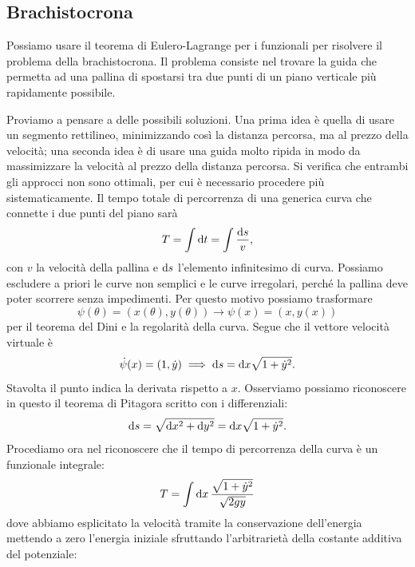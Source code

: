     \subsection{Brachistocrona}
    Possiamo usare il teorema di Eulero-Lagrange per i funzionali per risolvere il problema della brachistocrona. Il problema consiste nel trovare la guida che permetta ad una pallina di spostarsi tra due punti di un piano verticale più rapidamente possibile. 

    Proviamo a pensare a delle possibili soluzioni. Una prima idea è quella di usare un segmento rettilineo, minimizzando così la distanza percorsa, ma al prezzo della velocità; una seconda idea è di usare una guida molto ripida in modo da massimizzare la velocità al prezzo della distanza percorsa. Si verifica che entrambi gli approcci non sono ottimali, per cui è necessario procedere più sistematicamente. Il tempo totale di percorrenza di una generica curva che connette i due punti del piano sarà
    \begin{equation}
        T = \int \mathrm{d} t = \int \frac{\mathrm{d} s}{v},
    \end{equation}
    con $v$ la velocità della pallina e $\mathrm{d} s$ l'elemento infinitesimo di curva. Possiamo escludere a priori le curve non semplici e le curve irregolari, perché la pallina deve poter scorrere senza impedimenti. Per questo motivo possiamo trasformare
    \begin{equation}
        \psi(\theta) = (x(\theta),y(\theta))\to \psi(x) = (x,y(x))
    \end{equation}
    per il teorema del Dini e la regolarità della curva. Segue che il vettore velocità virtuale è 
    \begin{equation}
        \dot{\psi}(x) = (1,\dot{y})\implies \mathrm{d} s = \mathrm{d} x\sqrt{1+\dot{y}^2}.
    \end{equation}
    Stavolta il punto indica la derivata rispetto a $x$. Osserviamo possiamo riconoscere in questo il teorema di Pitagora scritto con i differenziali:
    \begin{equation}
        \mathrm{d} s = \sqrt{\mathrm{d} x^2 + \mathrm{d} y^2}= \mathrm{d} x\sqrt{1+\dot{y}^2}.
    \end{equation}
    Procediamo ora nel riconoscere che il tempo di percorrenza della curva è un funzionale integrale:
    \begin{equation}
        T = \int\mathrm{d} x\,\frac{\sqrt{1+\dot{y}^2}}{\sqrt{2gy}}
    \end{equation}
    dove abbiamo esplicitato la velocità tramite la conservazione dell'energia mettendo a zero l'energia iniziale sfruttando l'arbitrarietà della costante additiva del potenziale: 
